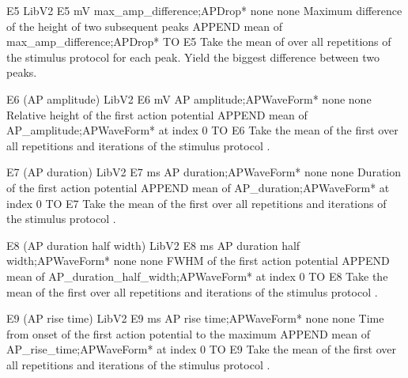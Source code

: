 \begin{efeature}
  {E5}
  {LibV2}
  {E5}
  {mV}
  {max\_amp\_difference;APDrop*}
  {none}
  {none}
  {Maximum difference of the height of two subsequent peaks}
  {
  APPEND mean of max\_amp\_difference;APDrop* TO E5
  }
  Take the mean of  over all repetitions of the stimulus protocol  for each peak.
  Yield the biggest difference between two peaks.
  
\end{efeature}

\begin{efeature}
  {E6 (AP amplitude)}
  {LibV2}
  {E6}
  {mV}
  {AP amplitude;APWaveForm*}
  {none}
  {none}
  {Relative height of the first action potential}
  {
  APPEND mean of AP\_amplitude;APWaveForm* at index 0 TO E6
  }
  Take the mean of the first  over all repetitions and iterations of the stimulus protocol .
  
\end{efeature}

\begin{efeature}
  {E7 (AP duration)}
  {LibV2}
  {E7}
  {ms}
  {AP duration;APWaveForm*}
  {none}
  {none}
  {Duration of the first action potential}
  {
  APPEND mean of AP\_duration;APWaveForm* at index 0 TO E7
  }
  Take the mean of the first  over all repetitions and iterations of the stimulus protocol .
  
\end{efeature}

\begin{efeature}
  {E8 (AP duration half width)}
  {LibV2}
  {E8}
  {ms}
  {AP duration half width;APWaveForm*}
  {none}
  {none}
  {FWHM of the first action potential}
  {
  APPEND mean of AP\_duration\_half\_width;APWaveForm* at index 0 TO E8
  }
  Take the mean of the first  over all repetitions and iterations of the stimulus protocol .
  
\end{efeature}

\begin{efeature}
  {E9 (AP rise time)}
  {LibV2}
  {E9}
  {ms}
  {AP rise time;APWaveForm*}
  {none}
  {none}
  {Time from onset of the first action potential to the maximum}
  {
  APPEND mean of AP\_rise\_time;APWaveForm* at index 0 TO E9
  }
  Take the mean of the first  over all repetitions and iterations of the stimulus protocol .
  
\end{efeature}

